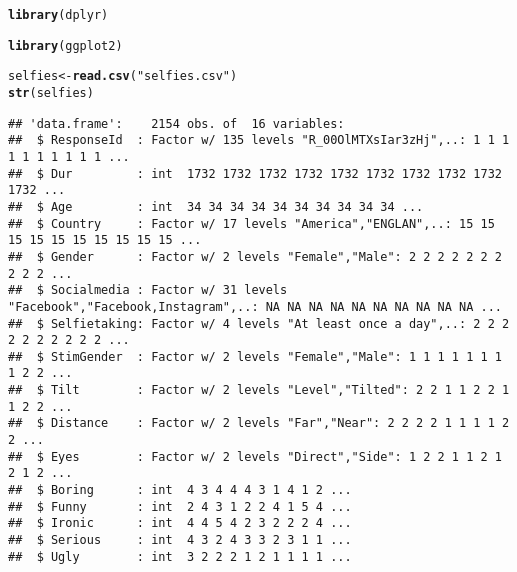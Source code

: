 \documentclass{article}\usepackage[]{graphicx}\usepackage[]{color}
\makeatletter
\newcommand{\hlstr}[1]{\textcolor[rgb]{0.192,0.494,0.8}{#1}}%
\newcommand{\hlstd}[1]{\textcolor[rgb]{0.345,0.345,0.345}{#1}}%
\newcommand{\hlkwb}[1]{\textcolor[rgb]{0.69,0.353,0.396}{#1}}%
\newcommand{\hlkwd}[1]{\textcolor[rgb]{0.737,0.353,0.396}{\textbf{#1}}}%
\newenvironment{kframe}{%
 \def\at@end@of@kframe{}%
 \ifinner\ifhmode%
  \def\at@end@of@kframe{\end{minipage}}%
  \begin{minipage}{\columnwidth}%
 \fi\fi%
 \def\FrameCommand##1{\hskip\@totalleftmargin \hskip-\fboxsep
 \colorbox{shadecolor}{##1}\hskip-\fboxsep
     \hskip-\linewidth \hskip-\@totalleftmargin \hskip\columnwidth}%
 \MakeFramed {\advance\hsize-\width
   \@totalleftmargin\z@ \linewidth\hsize
   \@setminipage}}%
 {\par\unskip\endMakeFramed%
 \at@end@of@kframe}
\newenvironment{knitrout}{}{} %
\makeatother
\begin{document}
\begin{knitrout}
\color{fgcolor}\begin{kframe}
\begin{alltt}
\hlkwd{library}\hlstd{(dplyr)}
\end{alltt}


{\ttfamily\noindent\itshape\color{messagecolor}{\#\# \\\#\# Attaching package: 'dplyr'}}

{\ttfamily\noindent\itshape\color{messagecolor}{\#\# The following objects are masked from 'package:stats':\\\#\# \\\#\#\ \ \ \  filter, lag}}

{\ttfamily\noindent\itshape\color{messagecolor}{\#\# The following objects are masked from 'package:base':\\\#\# \\\#\#\ \ \ \  intersect, setdiff, setequal, union}}\begin{alltt}
\hlkwd{library}\hlstd{(ggplot2)}

\hlstd{selfies} \hlkwb{<-} \hlkwd{read.csv}\hlstd{(}\hlstr{"selfies.csv"}\hlstd{)}
\hlkwd{str}\hlstd{(selfies)}
\end{alltt}
\begin{verbatim}
## 'data.frame':	2154 obs. of  16 variables:
##  $ ResponseId  : Factor w/ 135 levels "R_00OlMTXsIar3zHj",..: 1 1 1 1 1 1 1 1 1 1 ...
##  $ Dur         : int  1732 1732 1732 1732 1732 1732 1732 1732 1732 1732 ...
##  $ Age         : int  34 34 34 34 34 34 34 34 34 34 ...
##  $ Country     : Factor w/ 17 levels "America","ENGLAN",..: 15 15 15 15 15 15 15 15 15 15 ...
##  $ Gender      : Factor w/ 2 levels "Female","Male": 2 2 2 2 2 2 2 2 2 2 ...
##  $ Socialmedia : Factor w/ 31 levels "Facebook","Facebook,Instagram",..: NA NA NA NA NA NA NA NA NA NA ...
##  $ Selfietaking: Factor w/ 4 levels "At least once a day",..: 2 2 2 2 2 2 2 2 2 2 ...
##  $ StimGender  : Factor w/ 2 levels "Female","Male": 1 1 1 1 1 1 1 1 2 2 ...
##  $ Tilt        : Factor w/ 2 levels "Level","Tilted": 2 2 1 1 2 2 1 1 2 2 ...
##  $ Distance    : Factor w/ 2 levels "Far","Near": 2 2 2 2 1 1 1 1 2 2 ...
##  $ Eyes        : Factor w/ 2 levels "Direct","Side": 1 2 2 1 1 2 1 2 1 2 ...
##  $ Boring      : int  4 3 4 4 4 3 1 4 1 2 ...
##  $ Funny       : int  2 4 3 1 2 2 4 1 5 4 ...
##  $ Ironic      : int  4 4 5 4 2 3 2 2 2 4 ...
##  $ Serious     : int  4 3 2 4 3 3 2 3 1 1 ...
##  $ Ugly        : int  3 2 2 2 1 2 1 1 1 1 ...
\end{verbatim}
\end{kframe}
\end{knitrout}
\end{document}
